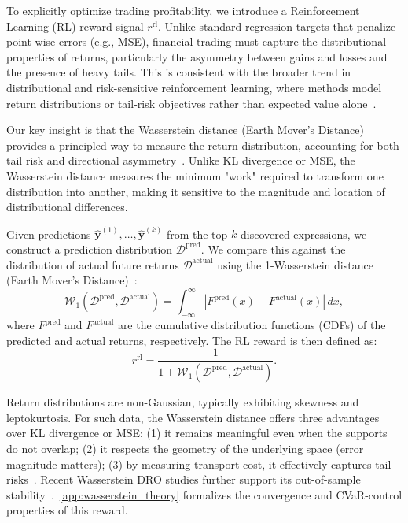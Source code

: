 To explicitly optimize trading profitability, we introduce a Reinforcement Learning (RL) reward signal $r^{\text{rl}}$. Unlike standard regression targets that penalize point-wise errors (e.g., MSE), financial trading must capture the distributional properties of returns, particularly the asymmetry between gains and losses and the presence of heavy tails. This is consistent with the broader trend in distributional and risk-sensitive reinforcement learning, where methods model return distributions or tail-risk objectives rather than expected value alone~\cite{chow2015cvar}.

Our key insight is that the Wasserstein distance (Earth Mover's Distance) provides a principled way to measure the return distribution, accounting for both tail risk and directional asymmetry~\cite{villani2009optimal}. Unlike KL divergence or MSE, the Wasserstein distance measures the minimum "work" required to transform one distribution into another, making it sensitive to the magnitude and location of distributional differences.

Given predictions $\hat{\mathbf{y}}^{(1)}, \ldots, \hat{\mathbf{y}}^{(k)}$ from the top-$k$ discovered expressions, we construct a prediction distribution $\mathcal{D}^{\text{pred}}$. We compare this against the distribution of actual future returns $\mathcal{D}^{\text{actual}}$ using the 1-Wasserstein distance (Earth Mover's Distance)~\cite{villani2009optimal}:
\begin{equation}
\mathcal{W}_{1}(\mathcal{D}^{\text{pred}}, \mathcal{D}^{\text{actual}}) = \int_{-\infty}^{\infty} |F^{\text{pred}}(x) - F^{\text{actual}}(x)| \, dx,
\label{eq:wasserstein}
\end{equation}
where $F^{\text{pred}}$ and $F^{\text{actual}}$ are the cumulative distribution functions (CDFs) of the predicted and actual returns, respectively. The RL reward is then defined as:
\begin{equation}
r^{\text{rl}} = \frac{1}{1 + \mathcal{W}_{1}(\mathcal{D}^{\text{pred}}, \mathcal{D}^{\text{actual}})}.
\label{eq:rlreward}
\end{equation}

Return distributions are non-Gaussian, typically exhibiting skewness and leptokurtosis. For such data, the Wasserstein distance offers three advantages over KL divergence or MSE: (1) it remains meaningful even when the supports do not overlap; (2) it respects the geometry of the underlying space (error magnitude matters); (3) by measuring transport cost, it effectively captures tail risks~\cite{villani2009optimal}. Recent Wasserstein DRO studies further support its out-of-sample stability~\cite{pesenti2023pOrtfolio}.~\ref{app:wasserstein_theory} formalizes the convergence and CVaR-control properties of this reward.

